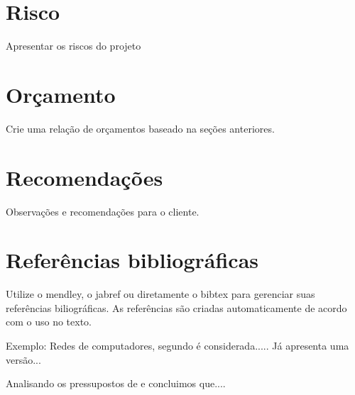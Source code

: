 \documentclass[	DIV=calc,%
							paper=a4,%
							fontsize=12pt,%
							onecolumn]{scrartcl}	 					%
\begin{document}
\section{Risco}
Apresentar os riscos do projeto

\section{Orçamento}
Crie uma relação de orçamentos baseado na seções anteriores.

\section{Recomendações}
Observações e recomendações para o cliente.

\section{Referências bibliográficas}
Utilize o mendley, o jabref ou diretamente o bibtex para gerenciar suas referências biliográficas. As referências são criadas automaticamente de acordo com o uso no texto.

Exemplo: Redes de computadores, segundo \cite{t2013} é considerada..... Já \cite{kurose2010} apresenta uma versão...

Analisando os pressupostos de \cite{ref3} e \cite{ref4} concluimos que....


\renewcommand\refname{} %

  
\end{document}

